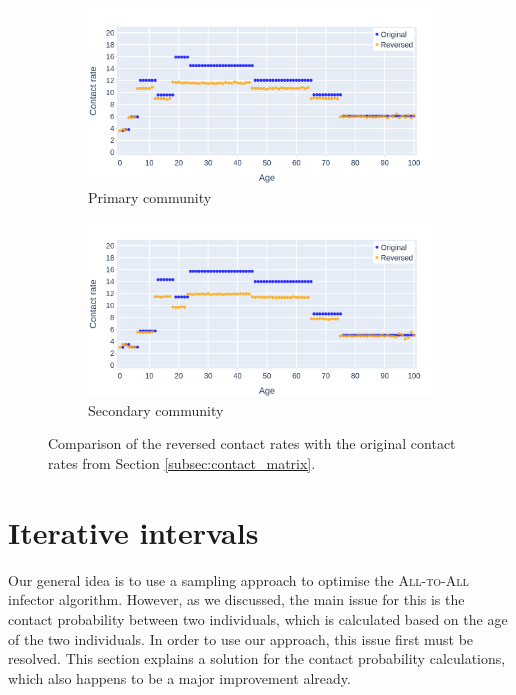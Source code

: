 \begin{figure}\ContinuedFloat
    \centering
    \begin{subfigure}{.8\linewidth}
        \centering
        \includegraphics[width=\textwidth]{4 - Sampling/fig/standard/standard_reverse_cr_primary.png}
        \caption{Primary community}
        \label{fig:reversed_cr_standard_primary}
    \end{subfigure}
    \begin{subfigure}{.8\linewidth}
        \centering
        \includegraphics[width=\textwidth]{4 - Sampling/fig/standard/standard_reverse_cr_secondary.png}
        \caption{Secondary community}
        \label{fig:reversed_cr_standard_secondary}
    \end{subfigure}
    \caption{Comparison of the reversed contact rates with the original contact rates from Section \ref{subsec:contact_matrix}.}
    \label{fig:reversed_cr_standard}
\end{figure}

\section{Iterative intervals}
\label{sec:iterative_intervals}
Our general idea is to use a sampling approach to optimise the \textsc{All-to-All} infector algorithm. However, as we discussed, the main issue for this is the contact probability between two individuals, which is calculated based on the age of the two individuals. In order to use our approach, this issue first must be resolved. This section explains a solution for the contact probability calculations, which also happens to be a major improvement already.

